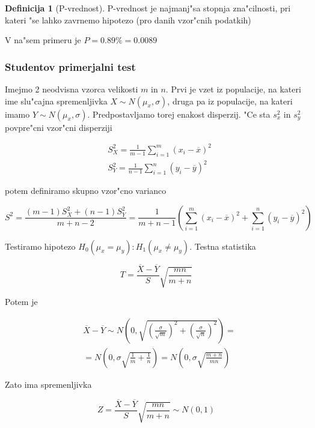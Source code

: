 \documentclass[a4paper,12pt]{article}
\theoremstyle{definition}
\newtheorem{defn}[counter]{Definicija}
\theoremstyle{remark}
\begin{document}
\begin{defn}[P-vrednost]
    P-vrednost je najmanj"sa stopnja zna"cilnosti, pri kateri "se lahko zavrnemo hipotezo (pro danih vzor"cnih
    podatkih)
\end{defn}

V na"sem primeru je $P = 0.89\% = 0.0089$

\subsubsection{Studentov primerjalni test}

Imejmo 2 neodvisna vzorca velikosti $m$ in $n$. Prvi je vzet iz populacije, na kateri ime slu"cajna spremenljivka
$X \sim N(\mu_x, \sigma)$, druga pa iz populacije, na kateri imamo $Y \sim N(\mu_x, \sigma)$. Predpostavljamo torej
enakost disperzij. "Ce sta $s_x^2$ in $s_y^2$ povpre"cni vzor"cni disperziji

\begin{align*}
    &S_X^2 = \frac{1}{m-1} \sum_{i=1}^{m} (x_i - \overline{x})^2 \\
    &S_Y^2 = \frac{1}{n-1} \sum_{i=1}^{n} (y_i - \overline{y})^2
\end{align*}

potem definiramo skupno vzor"cno varianco

\begin{equation*}
    S^2 = \frac{(m-1) S_X^2 + (n-1) S_Y^2}{m+n-2} = \frac{1}{m+n-1} (\sum_{i=1}^{m}
    (x_i - \overline{x})^2 + \sum_{i=1}^{n} (y_i - \overline{y})^2)
\end{equation*}

Testiramo hipotezo $H_0(\mu_x = \mu_y) : H_1(\mu_x \neq \mu_y)$. Testna statistika

\begin{equation*}
    T = \frac{\overline{X} - \overline{Y}}{S} \sqrt{\frac{mn}{m+n}}
\end{equation*}

Potem je

\begin{align*}
    &\overline{X} - \overline{Y} \sim N(0, \sqrt{(\frac{\sigma}{\sqrt{m}})^2 + (\frac{\sigma}{\sqrt{n}})^2}) = \\
    &= N(0, \sigma \sqrt{\frac{1}{m} + \frac{1}{n}}) = N(0, \sigma \sqrt{\frac{m+n}{mn}})
\end{align*}

Zato ima spremenljivka

\begin{equation*}
    Z = \frac{\overline{X} - \overline{Y}}{S} \sqrt{\frac{mn}{m+n}} \sim N(0,1)
\end{equation*}
\end{document}
